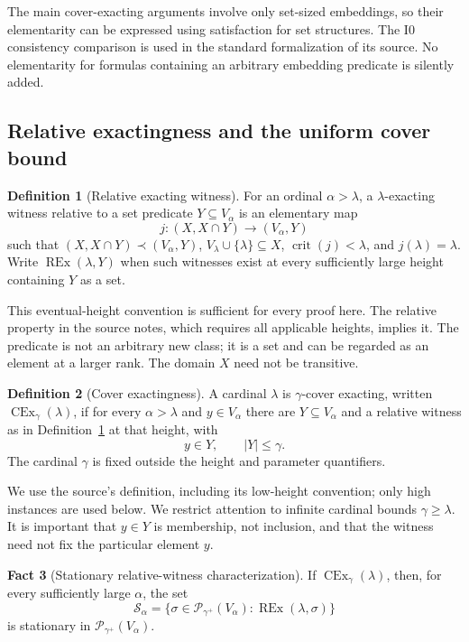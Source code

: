 \documentclass[11pt,letterpaper]{article}
\theoremstyle{definition}
\newtheorem{definition}{Definition}[section]
\newcommand{\CEx}{\operatorname{CEx}}
\newcommand{\crit}{\operatorname{crit}}
\newcommand{\Izero}{\mathrm{I0}}
\newcommand{\REx}{\operatorname{REx}}
\newcommand{\Pow}{\mathcal P}
\newtheorem{fact}[definition]{Fact}
\begin{document}
The main cover-exacting arguments involve only set-sized embeddings, so their
elementarity can be expressed using satisfaction for set structures. The
$\Izero$ consistency comparison is used in the standard formalization of its
source. No elementarity for formulas containing an arbitrary embedding
predicate is silently added.

\subsection{Relative exactingness and the uniform cover bound}

\begin{definition}[Relative exacting witness]\label{def:rex}
For an ordinal $\alpha>\lambda$, a $\lambda$-exacting witness relative
to a set predicate $Y\subseteq V_\alpha$ is an elementary map
\[
 j:(X,X\cap Y)\longrightarrow(V_\alpha,Y)
\]
such that $(X,X\cap Y)\prec(V_\alpha,Y)$,
$V_\lambda\cup\{\lambda\}\subseteq X$, $\crit(j)<\lambda$, and
$j(\lambda)=\lambda$. Write $\REx(\lambda,Y)$ when such witnesses exist at
every sufficiently large height containing $Y$ as a set.
\end{definition}

This eventual-height convention is sufficient for every proof here. The
relative property in the source notes, which requires all applicable heights,
implies it. The predicate is not an arbitrary new class; it is a set and can
be regarded as an element at a larger rank. The domain $X$ need not be
transitive.

\begin{definition}[Cover exactingness]\label{def:cover}
A cardinal $\lambda$ is $\gamma$-cover exacting, written $\CEx_\gamma(\lambda)$,
if for every $\alpha>\lambda$ and $y\in V_\alpha$ there are
$Y\subseteq V_\alpha$ and a relative witness as in Definition~\ref{def:rex}
at that height, with
\[
 y\in Y,\qquad |Y|\leq\gamma.
\]
The cardinal $\gamma$ is fixed outside the height and parameter quantifiers.
\end{definition}

We use the source's definition, including its low-height convention; only high
instances are used below. We restrict attention to infinite cardinal bounds
$\gamma\geq\lambda$. It is important that $y\in Y$ is membership, not inclusion,
and that the witness need not fix the particular element $y$.
\cite[Definitions 2.6 and 3.1]{cover}

\begin{fact}[Stationary relative-witness characterization]\label{fact:stationary}
If $\CEx_\gamma(\lambda)$, then, for every sufficiently large $\alpha$, the set
\[
 \mathcal S_\alpha=
 \{\sigma\in\Pow_{\gamma^+}(V_\alpha):\REx(\lambda,\sigma)\}
\]
is stationary in $\Pow_{\gamma^+}(V_\alpha)$.
\end{fact}
\end{document}
